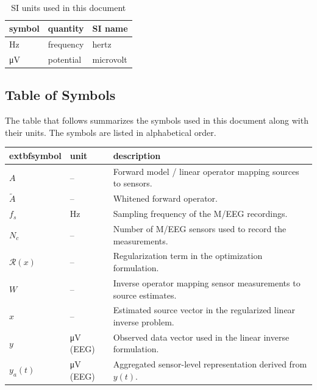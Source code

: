 \documentclass[12pt]{article}
\begin{document}
~\newline


\renewcommand{\arraystretch}{1.2}
\begin{table}[ht]
\noindent \begin{tabular}{l l l} 
\toprule		
\textbf{symbol} & \textbf{quantity} & \textbf{SI name}\\
\midrule 
    \si{\hertz} & frequency & hertz\\
    \si{\micro\volt} & potential & microvolt\\
\bottomrule
\end{tabular}
\caption{SI units used in this document}
\end{table}




\subsection{Table of Symbols}


The table that follows summarizes the symbols used in this document along with their units. The symbols are listed in alphabetical order.


\renewcommand{\arraystretch}{1.2}
\noindent \begin{longtable*}{l l p{12cm}} \toprule
	extbf{symbol} & \textbf{unit} & \textbf{description}\\
\midrule 
    $A$ & -- & Forward model / linear operator mapping sources to sensors.\\
    $\tilde{A}$ & -- & Whitened forward operator.\\
    $f_s$ & \si{\hertz} & Sampling frequency of the M/EEG recordings.\\
    $N_c$ & -- & Number of M/EEG sensors used to record the measurements.\\
    $\mathcal{R}(x)$ & -- & Regularization term in the optimization formulation.\\
    $W$ & -- & Inverse operator mapping sensor measurements to source estimates.\\
    $\hat{x}$ & -- & Estimated source vector in the regularized linear inverse problem.\\
    $y$ & \si{\micro\volt} (EEG) & Observed data vector used in the linear inverse formulation.\\
    $y_a(t)$ & \si{\micro\volt} (EEG) & Aggregated sensor-level representation derived from $y(t)$.\\
\bottomrule
\end{longtable*}
\end{document}
